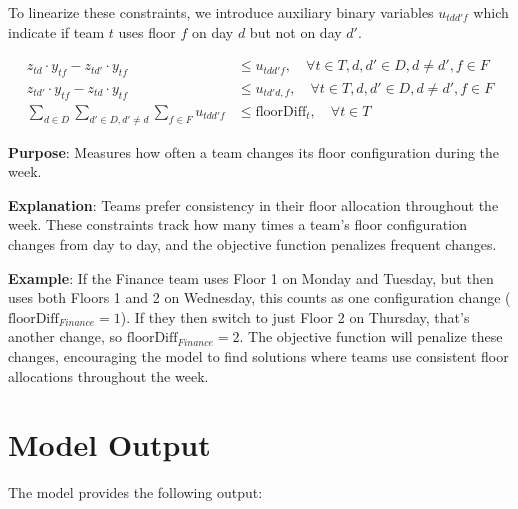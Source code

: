 \documentclass[12pt,a4paper]{article}
\begin{document}
To linearize these constraints, we introduce auxiliary binary variables $u_{tdd'f}$ which indicate if team $t$ uses floor $f$ on day $d$ but not on day $d'$.

\begin{align}
z_{td} \cdot y_{tf} - z_{td'} \cdot y_{tf} &\leq u_{tdd'f}, \quad \forall t \in T, d,d' \in D, d \neq d', f \in F \\
z_{td'} \cdot y_{tf} - z_{td} \cdot y_{tf} &\leq u_{td'd,f}, \quad \forall t \in T, d,d' \in D, d \neq d', f \in F \\
\sum_{d \in D} \sum_{d' \in D, d' \neq d} \sum_{f \in F} u_{tdd'f} &\leq \text{floorDiff}_t, \quad \forall t \in T
\end{align}

\textbf{Purpose}: Measures how often a team changes its floor configuration during the week.

\textbf{Explanation}: Teams prefer consistency in their floor allocation throughout the week. These constraints track how many times a team's floor configuration changes from day to day, and the objective function penalizes frequent changes.

\textbf{Example}: If the Finance team uses Floor 1 on Monday and Tuesday, but then uses both Floors 1 and 2 on Wednesday, this counts as one configuration change ($\text{floorDiff}_{Finance} = 1$). If they then switch to just Floor 2 on Thursday, that's another change, so $\text{floorDiff}_{Finance} = 2$. The objective function will penalize these changes, encouraging the model to find solutions where teams use consistent floor allocations throughout the week.

\section{Model Output}

The model provides the following output:
\end{document}
